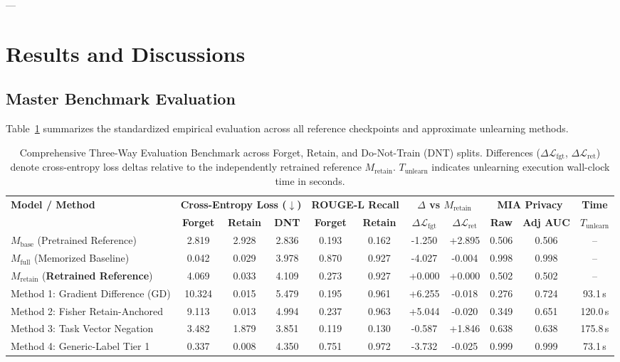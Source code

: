 \documentclass[11pt,a4paper]{article}
\begin{document}
---

\section{Results and Discussions}

\subsection{Master Benchmark Evaluation}
Table~\ref{tab:master_benchmark} summarizes the standardized empirical evaluation across all reference checkpoints and approximate unlearning methods.

\begin{table}[htbp]
\centering
\small
\caption{Comprehensive Three-Way Evaluation Benchmark across Forget, Retain, and Do-Not-Train (DNT) splits. Differences ($\Delta \mathcal{L}_{\text{fgt}}$, $\Delta \mathcal{L}_{\text{ret}}$) denote cross-entropy loss deltas relative to the independently retrained reference $M_{\text{retain}}$. $T_{\text{unlearn}}$ indicates unlearning execution wall-clock time in seconds.}
\label{tab:master_benchmark}
\begin{tabular*}{\textwidth}{@{\extracolsep{\fill}}lcccccccccc@{}}
\toprule
\textbf{Model / Method} & \multicolumn{3}{c}{\textbf{Cross-Entropy Loss ($\downarrow$)}} & \multicolumn{2}{c}{\textbf{ROUGE-L Recall}} & \multicolumn{2}{c}{\textbf{$\Delta$ vs $M_{\text{retain}}$}} & \multicolumn{2}{c}{\textbf{MIA Privacy}} & \textbf{Time} \\
\cmidrule(lr){2-4} \cmidrule(lr){5-6} \cmidrule(lr){7-8} \cmidrule(lr){9-10} \cmidrule(lr){11-11}
& \textbf{Forget} & \textbf{Retain} & \textbf{DNT} & \textbf{Forget} & \textbf{Retain} & $\Delta \mathcal{L}_{\text{fgt}}$ & $\Delta \mathcal{L}_{\text{ret}}$ & \textbf{Raw} & \textbf{Adj AUC} & $T_{\text{unlearn}}$ \\
\midrule
$M_{\text{base}}$ (Pretrained Reference) & 2.819 & 2.928 & 2.836 & 0.193 & 0.162 & -1.250 & +2.895 & 0.506 & 0.506 & -- \\
$M_{\text{full}}$ (Memorized Baseline) & 0.042 & 0.029 & 3.978 & 0.870 & 0.927 & -4.027 & -0.004 & 0.998 & 0.998 & -- \\
$M_{\text{retain}}$ (\textbf{Retrained Reference}) & 4.069 & 0.033 & 4.109 & 0.273 & 0.927 & +0.000 & +0.000 & 0.502 & 0.502 & -- \\
\midrule
Method 1: Gradient Difference (GD) & 10.324 & 0.015 & 5.479 & 0.195 & 0.961 & +6.255 & -0.018 & 0.276 & 0.724 & 93.1\,s \\
Method 2: Fisher Retain-Anchored & 9.113 & 0.013 & 4.994 & 0.237 & 0.963 & +5.044 & -0.020 & 0.349 & 0.651 & 120.0\,s \\
Method 3: Task Vector Negation & 3.482 & 1.879 & 3.851 & 0.119 & 0.130 & -0.587 & +1.846 & 0.638 & 0.638 & 175.8\,s \\
Method 4: Generic-Label Tier 1 & 0.337 & 0.008 & 4.350 & 0.751 & 0.972 & -3.732 & -0.025 & 0.999 & 0.999 & 73.1\,s \\
\bottomrule
\end{tabular*}
\end{table}
\end{document}
